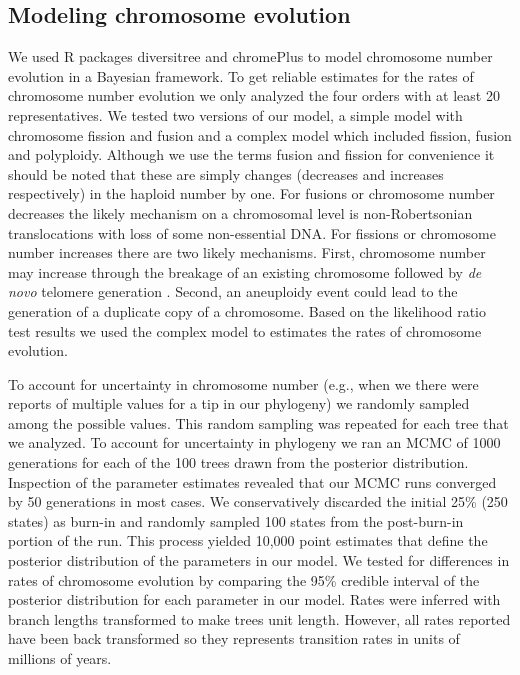 \subsection{Modeling chromosome evolution}
We used R packages diversitree \citep{fitzjohn2012} and chromePlus \citep{blackmon2019meiotic} to model chromosome number evolution in a Bayesian framework.
To get reliable estimates for the rates of chromosome number evolution we only analyzed the four orders with at least 20 representatives.
We tested two versions of our model, a simple model with chromosome fission and fusion and a complex model which included fission, fusion and polyploidy.
Although we use the terms fusion and fission for convenience it should be noted that these are simply changes (decreases and increases respectively) in the haploid number by one.
For fusions or chromosome number decreases the likely mechanism on a chromosomal level is non-Robertsonian translocations with loss of some non-essential DNA.
For fissions or chromosome number increases there are two likely mechanisms.
First, chromosome number may increase through the breakage of an existing chromosome followed by \textit{de novo} telomere generation \citep{harrington1991, tsujimoto1999}.
Second, an aneuploidy event could lead to the generation of a duplicate copy of a chromosome.
Based on the likelihood ratio test results we used the complex model to estimates the rates of chromosome evolution.

To account for uncertainty in chromosome number (e.g., when we there were reports of multiple values for a tip in our phylogeny) we randomly sampled among the possible values.
This random sampling was repeated for each tree that we analyzed.
To account for uncertainty in phylogeny we ran an MCMC of 1000 generations for each of the 100 trees drawn from the posterior distribution.
Inspection of the parameter estimates revealed that our MCMC runs converged by 50 generations in most cases.  
We conservatively discarded the initial 25\% (250 states) as burn-in and randomly sampled 100 states from the post-burn-in portion of the run. 
This process yielded 10,000 point estimates that define the posterior distribution of the parameters in our model.
We tested for differences in rates of chromosome evolution by comparing the 95\% credible interval of the posterior distribution for each parameter in our model.
Rates were inferred with branch lengths transformed to make trees unit length.
However, all rates reported have been back transformed so they represents transition rates in units of millions of years.

